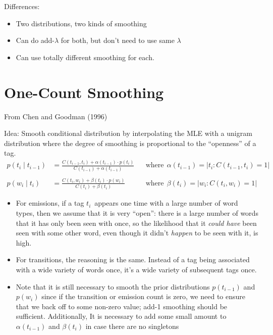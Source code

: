 \documentclass[11pt,letterpaper]{article}
\newcommand{\wcurr}{\ensuremath{w_i}}
\newcommand{\tcurr}{\ensuremath{t_i}}
\newcommand{\tprev}{\ensuremath{t_{i-1}}}
\begin{document}
Differences:

\begin{itemize}
  \item Two distributions, two kinds of smoothing
  \item Can do add-$\lambda$ for both, but don't need to use same $\lambda$
  \item Can use totally different smoothing for each.
\end{itemize}


\section{One-Count Smoothing}

From Chen and Goodman (1996)

Idea: Smooth conditional distribution by interpolating the MLE with a unigram distribution where the degree of smoothing is proportional to the ``openness'' of a tag.
\begin{align*}
  p(\tcurr \mid \tprev) &= \frac{C(\tprev,\tcurr) + \alpha(\tprev) \cdot p(\tcurr)}{C(\tprev) + \alpha(\tprev)}
  &&\text{where} ~~ \alpha(\tprev) = | \tcurr: C(\tprev,\tcurr) = 1 | \\\\
  p(\wcurr \mid \tcurr) &= \frac{C(\tcurr,\wcurr) + \beta(\tcurr) \cdot p(\wcurr)}{C(\tcurr) + \beta(\tcurr)}
  &&\text{where} ~~ \beta(\tcurr) = | \wcurr: C(\tcurr,\wcurr) = 1 |
\end{align*}

\begin{itemize}
  \item For emissions, if a tag \tcurr\ appears one time with a large number of word types, then we assume that it is very ``open'': there is a large number of words that it has only been seen with once, so the likelihood that it \textit{could have} been seen with some other word, even though it didn't \textit{happen} to be seen with it, is high.
  \item For transitions, the reasoning is the same.  Instead of a tag being associated with a wide variety of words once, it's a wide variety of subsequent tags once.

  \item Note that it is still necessary to smooth the prior distributions $p(\tprev)$ and $p(w_i)$ since if the transition or emission count is zero, we need to ensure that we back off to some non-zero value; add-1 smoothing should be sufficient.  Additionally, It is necessary to add some small amount to $\alpha(\tprev)$ and $\beta(\tcurr)$ in case there are no singletons
\end{itemize}
\end{document}
